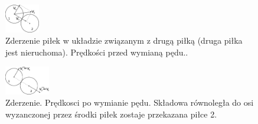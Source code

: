 \documentclass{instrukcja}
\begin{document}
\begin{figure}
\centering
\includegraphics[width=0.135\textwidth]{zderzenie1.pdf}

\caption{Zderzenie piłek w układzie związanym z drugą piłką (druga piłka jest nieruchoma). Prędkości przed wymianą pędu..}
\end{figure}
\begin{figure}
\centering
\includegraphics[width=0.175\textwidth]{zderzenie2.pdf}

\caption{Zderzenie. Prędkosci po wymianie pędu. Składowa równoległa do osi wyzanczonej przez środki piłek zostaje przekazana piłce 2.}
\end{figure}
\end{document}
